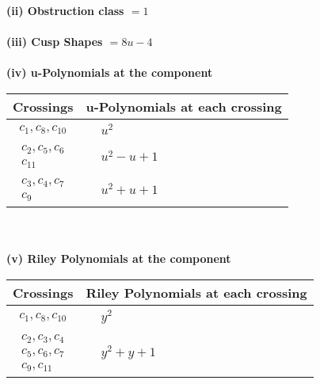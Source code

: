 \documentclass[1p]{elsarticle_modified}
\theoremstyle{definition}
\begin{document}
\flushleft \textbf{(ii) Obstruction class $= 1$}\\~\\
\flushleft \textbf{(iii) Cusp Shapes $= 8 u-4$}\\~\\
\newpage\renewcommand{\arraystretch}{1}
\flushleft \textbf{(iv) u-Polynomials at the component}\newline \\
\begin{tabular}{m{50pt}|m{274pt}}
Crossings & \hspace{64pt}u-Polynomials at each crossing \\
\hline $$\begin{aligned}c_{1},c_{8},c_{10}\end{aligned}$$&$\begin{aligned}
&u^2
\end{aligned}$\\
\hline $$\begin{aligned}c_{2},c_{5},c_{6}\\c_{11}\end{aligned}$$&$\begin{aligned}
&u^2- u+1
\end{aligned}$\\
\hline $$\begin{aligned}c_{3},c_{4},c_{7}\\c_{9}\end{aligned}$$&$\begin{aligned}
&u^2+u+1
\end{aligned}$\\
\hline
\end{tabular}\\~\\
\newpage\renewcommand{\arraystretch}{1}
\flushleft \textbf{(v) Riley Polynomials at the component}\newline \\
\begin{tabular}{m{50pt}|m{274pt}}
Crossings & \hspace{64pt}Riley Polynomials at each crossing \\
\hline $$\begin{aligned}c_{1},c_{8},c_{10}\end{aligned}$$&$\begin{aligned}
&y^2
\end{aligned}$\\
\hline $$\begin{aligned}c_{2},c_{3},c_{4}\\c_{5},c_{6},c_{7}\\c_{9},c_{11}\end{aligned}$$&$\begin{aligned}
&y^2+y+1
\end{aligned}$\\
\hline
\end{tabular}\\~\\
\end{document}
